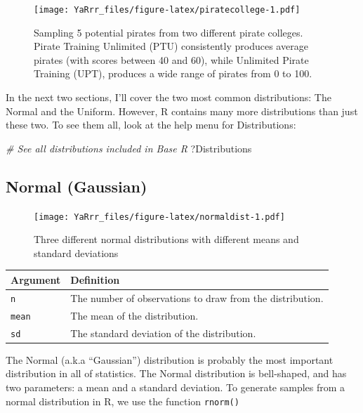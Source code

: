 \documentclass[]{book}
\newenvironment{Shaded}{\begin{snugshade}}{\end{snugshade}}
\newcommand{\CommentTok}[1]{\textcolor[rgb]{0.56,0.35,0.01}{\textit{#1}}}
\newcommand{\NormalTok}[1]{#1}
\theoremstyle{definition}
\theoremstyle{definition}
\theoremstyle{remark}
\begin{document}
\begin{figure}
\centering
\texttt{[image: YaRrr\_files/figure-latex/piratecollege-1.pdf]}
\caption{\label{fig:piratecollege}Sampling 5 potential pirates from two
different pirate colleges. Pirate Training Unlimited (PTU) consistently
produces average pirates (with scores between 40 and 60), while
Unlimited Pirate Training (UPT), produces a wide range of pirates from 0
to 100.}
\end{figure}

In the next two sections, I'll cover the two most common distributions:
The Normal and the Uniform. However, R contains many more distributions
than just these two. To see them all, look at the help menu for
Distributions:

\begin{Shaded}
\begin{Highlighting}[]
\CommentTok{# See all distributions included in Base R}
\NormalTok{?Distributions}
\end{Highlighting}
\end{Shaded}

\subsection{Normal (Gaussian)}\label{normal-gaussian}

\begin{figure}
\centering
\texttt{[image: YaRrr\_files/figure-latex/normaldist-1.pdf]}
\caption{\label{fig:normaldist}Three different normal distributions with
different means and standard deviations}
\end{figure}

\begin{longtable}[]{@{}ll@{}}
\toprule
Argument & Definition\tabularnewline
\midrule
\endhead
\texttt{n} & The number of observations to draw from the
distribution.\tabularnewline
\texttt{mean} & The mean of the distribution.\tabularnewline
\texttt{sd} & The standard deviation of the distribution.\tabularnewline
\bottomrule
\end{longtable}

The Normal (a.k.a ``Gaussian'') distribution is probably the most
important distribution in all of statistics. The Normal distribution is
bell-shaped, and has two parameters: a mean and a standard deviation. To
generate samples from a normal distribution in R, we use the function
\texttt{rnorm()}
\end{document}
